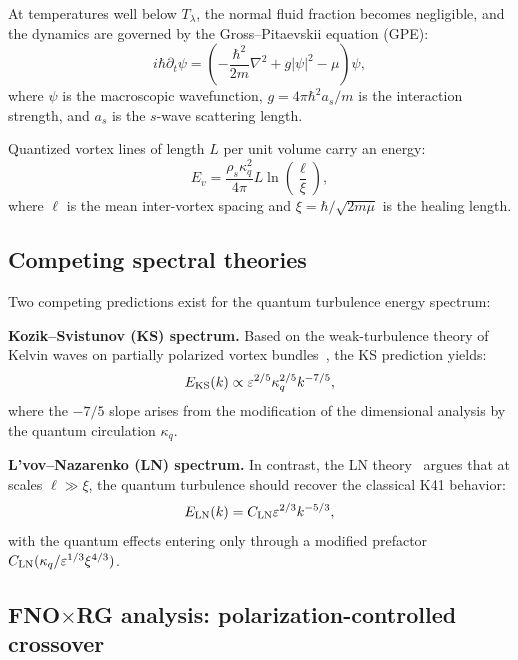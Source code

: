 At temperatures well below $T_\lambda$, the normal fluid fraction becomes negligible, and the dynamics are governed by the Gross--Pitaevskii equation (GPE):
\begin{equation}
i\hbar\partial_t\psi = \left(-\frac{\hbar^2}{2m}\nabla^2 + g|\psi|^2 - \mu\right)\psi,
\end{equation}
where $\psi$ is the macroscopic wavefunction, $g = 4\pi\hbar^2 a_s/m$ is the interaction strength, and $a_s$ is the $s$-wave scattering length.

Quantized vortex lines of length $L$ per unit volume carry an energy:
\begin{equation}
E_v = \frac{\rho_s\kappa_q^2}{4\pi}L\ln\left(\frac{\ell}{\xi}\right),
\end{equation}
where $\ell$ is the mean inter-vortex spacing and $\xi = \hbar/\sqrt{2m\mu}$ is the healing length.

\subsection{Competing spectral theories}

Two competing predictions exist for the quantum turbulence energy spectrum:

\textbf{Kozik--Svistunov (KS) spectrum.} Based on the weak-turbulence theory of Kelvin waves on partially polarized vortex bundles~\cite{kozik2004spectrum}, the KS prediction yields:
\begin{equation}\label{eq:ks_spectrum}
E_{\text{KS}}(k) \propto \varepsilon^{2/5}\kappa_q^{2/5} k^{-7/5},
\end{equation}
where the $-7/5$ slope arises from the modification of the dimensional analysis by the quantum circulation $\kappa_q$.

\textbf{L'vov--Nazarenko (LN) spectrum.} In contrast, the LN theory~\cite{lvov2001condensate} argues that at scales $\ell \gg \xi$, the quantum turbulence should recover the classical K41 behavior:
\begin{equation}\label{eq:ln_spectrum}
E_{\text{LN}}(k) = C_{\text{LN}}\varepsilon^{2/3}k^{-5/3},
\end{equation}
with the quantum effects entering only through a modified prefactor $C_{\text{LN}}(\kappa_q/\varepsilon^{1/3}\xi^{4/3})$.

\subsection{\texorpdfstring{FNO$\times$}{FNO x}RG analysis: polarization-controlled crossover}

